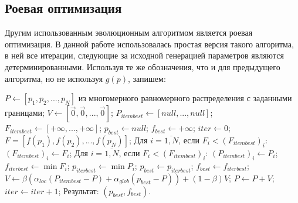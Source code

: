 \subsection{Роевая оптимизация}
Другим использованным эволюционным алгоритмом является роевая оптимизация. В данной работе использовалась простая версия такого алгоритма, в ней все итерации, следующие за исходной генерацией параметров являются детерминированными. Используя те же обозначения, что и для предыдущего алгоритма, но не используя $g(p)$, запишем:
\begin{algorithm}
\begin{algorithmic}
\State $P \gets [p_1, p_2, ..., p_N]$ из многомерного равномерного распределения с заданными границами;
\State $V \gets [\vec{0}, \vec{0}, ..., \vec{0}]$;
\State $P_{itembest} \gets [null, ..., null]$;
\State $F_{itembest} \gets [+\infty, ..., +\infty]$;
\State $p_{best} \gets null$;
\State $f_{best} \gets +\infty$;
\State $iter \gets 0$;
	\State $F = [f(p_1), f(p_2), ..., f(p_N)]$;
	\State Для $i=\overline{1,N}$, если $F_i < (F_{itembest})_i$: $(F_{itembest})_i \gets F_i$;
	\State Для $i=\overline{1,N}$, если $F_i < (F_{itembest})_i$: $(P_{itembest})_i \gets P_i$;
	\State $f_{iterbest} \gets \min{F_i}$;
	\State $p_{iterbest} \gets \min{P_i}$;
		\State $p_{best} \gets p_{iterbest}$;
		\State $f_{best} \gets f_{iterbest}$;
	\EndIf
	\State $V \gets \beta(\alpha_{loc}(P_{itembest} - P)+\alpha_{glob}(p_{best} - P)) + (1-\beta)V$;
	\State $P \gets P + V$;
	\State $iter \gets iter+1$;
\EndWhile
\State Результат: $(p_{best}, f_{best})$.
\end{algorithmic}
\end{algorithm}